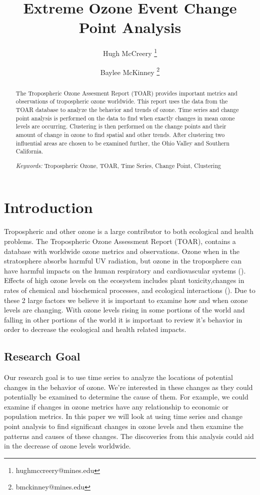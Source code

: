 \documentclass[11pt, oneside]{article}
\title{Extreme Ozone Event Change Point Analysis}
\author[1]{Hugh McCreery \thanks{hughmccreery@mines.edu}}
\author[1]{Baylee McKinney \thanks{bmckinney@mines.edu}}
\affil[1]{Colorado School of Mines Department of Applied Mathematics and Statistics}
\date{}
\providecommand{\keywords}[1]{\textit{Keywords:} #1}
\theoremstyle{definition}
\begin{document}
\maketitle
\begin{abstract}
The Tropospheric Ozone Assesment Report (TOAR) provides important metrics and observations of tropospheric ozone worldwide. This report uses the data from the TOAR database to analyze the behavior and trends of ozone. Time series and change point analysis is performed on the data to find when exactly changes in mean ozone levels are occurring. Clustering is then performed on the change points and their amount of change in ozone to find spatial and other trends. After clustering two influential areas are chosen to be examined further, the Ohio Valley and Southern California. 

\smallskip
\keywords{Tropospheric Ozone, TOAR, Time Series, Change Point, Clustering}
\end{abstract}

\newpage

\tableofcontents

\newpage

\section{Introduction} %
Tropospheric and other ozone is a large contributor to both ecological and health problems. The Tropospheric Ozone Assessment Report (TOAR), contains a database with worldwide ozone metrics and observations. Ozone when in the stratosphere absorbs harmful UV radiation, but ozone in the troposphere can have harmful impacts on the human respiratory and cardiovascular systems (\cite{fleming}). Effects of high ozone levels on the ecosystem includes plant toxicity,changes in rates of chemical and biochemical processes, and ecological interactions (\cite{ecological}). Due to these 2 large factors we believe it is important to examine how and when ozone levels are changing. With ozone levels rising in some portions of the world and falling in other portions of the world it is important to review it's behavior in order to decrease  the ecological and health related impacts.


\subsection{Research Goal} 
Our research goal is to use time series to analyze the locations of potential changes in the behavior of ozone. We're interested in these changes as they could potentially be examined to determine the cause of them. For example, we could examine if changes in ozone metrics have any relationship to economic or population metrics. In this paper we will look at using time series and change point analysis to find significant changes in ozone levels and then examine the patterns and causes of these changes. The discoveries from this analysis could aid in the decrease of ozone levels worldwide.
\end{document}
